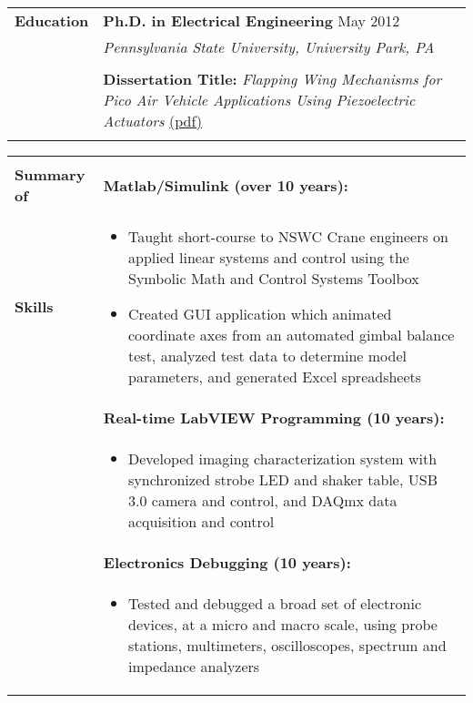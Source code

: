 \documentclass{article}[16pt]
\newlength{\lcolw}
\newlength{\rcolw}
\newlength{\hlcolw}
\newlength{\itemmargin}
\begin{document}
\begin{tabular}{L{\hlcolw}  L{\rcolw}}
\textbf{\Large Education} & \textbf{\large Ph.D. in Electrical Engineering} \hfill {\large May 2012} \\ 
& {\it\large Pennsylvania State University, University Park, PA} \\ \\
&  \textbf{Dissertation Title:} \textit{Flapping Wing Mechanisms for Pico Air Vehicle Applications Using Piezoelectric Actuators}
\href{http://www.mne.psu.edu/mrl/theses/mateti.pdf}{(pdf)} \\
 \\ \hline  \hline
\end{tabular}

\begin{tabular}{L{\hlcolw}  L{\rcolw}}
\hline \hline \\
\textbf{\Large Summary of } & 
\textbf{Matlab/Simulink (over 10 years):} 
\\
\textbf{\Large Skills} & 
\vspace{-0.25in}
\begin{itemize}[leftmargin = \itemmargin]
\item Taught short-course to NSWC Crane engineers on applied linear systems and control using the Symbolic Math and Control Systems Toolbox
\item Created GUI application which animated coordinate axes from an automated gimbal balance test, analyzed test data to determine model parameters, and generated Excel spreadsheets

\end{itemize} \\
& \textbf{Real-time LabVIEW Programming (10 years):} \\
& \vspace{-0.25in}
\begin{itemize}[leftmargin = \itemmargin]
\item Developed imaging characterization system with synchronized strobe LED and shaker table, USB 3.0 camera and control, and DAQmx data acquisition and control
\end{itemize} \\

& \textbf{Electronics Debugging (10 years):} \\
&
\vspace{-0.25in}
\begin{itemize}[leftmargin = \itemmargin]
\item Tested and debugged a broad set of electronic devices, at a micro and macro scale, using probe stations, multimeters, oscilloscopes, spectrum and impedance analyzers
\end{itemize}
\\


\end{tabular}
\end{document}
